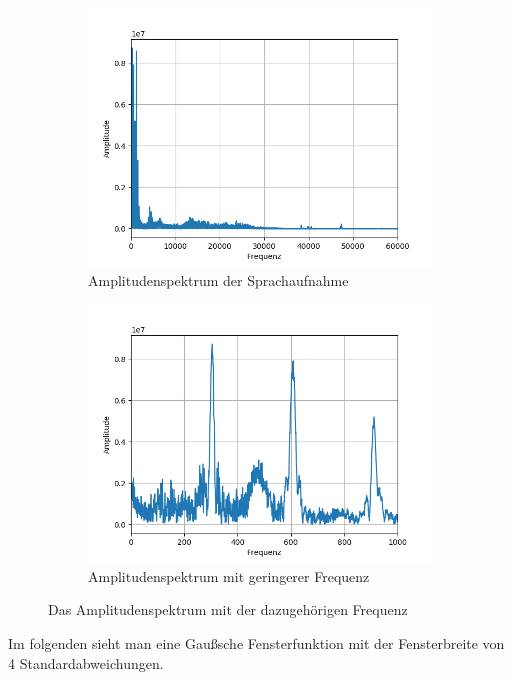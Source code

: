 \documentclass[12pt, oneside, a4paper, \docLanguage]{report}
\begin{document}
\begin{figure}[H]
\centering
	\begin{subfigure}{.5\textwidth}
  		\centering
 		 \includegraphics[width=.95\linewidth]{../data/img/testspektrum1.png}
  		\caption{Amplitudenspektrum der Sprachaufnahme}
 		 \label{fig:sub1}
	\end{subfigure}%
	\begin{subfigure}{.5\textwidth}
  		\centering
 		 \includegraphics[width=.95\linewidth]{../data/img/testspektrum3.png}
  		\caption{Amplitudenspektrum mit geringerer Frequenz}
  		\label{fig:sub2}
	\end{subfigure}
	\caption{Das Amplitudenspektrum mit der dazugehörigen Frequenz}
	\label{fig:test}
\end{figure}
\newpage
Im folgenden sieht man eine Gaußsche Fensterfunktion mit der Fensterbreite von 4 Standardabweichungen.
\end{document}
